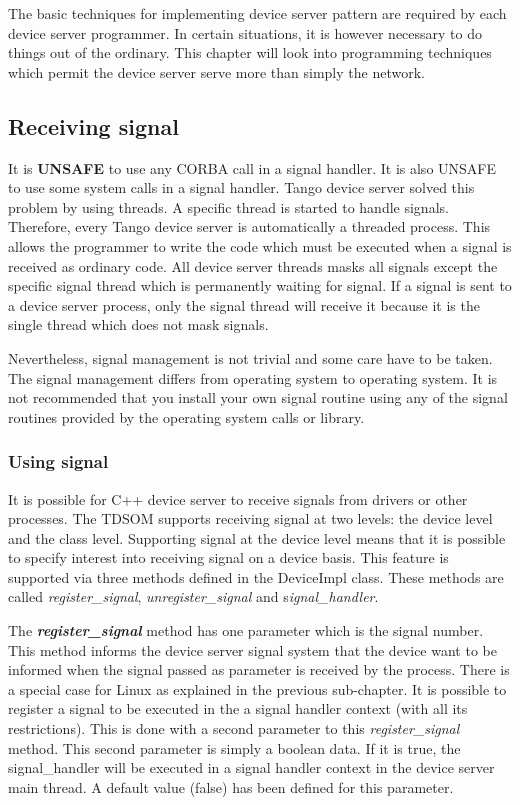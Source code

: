 The basic techniques for implementing device server pattern are required
by each device server programmer. In certain situations, it is however
necessary to do things out of the ordinary. This chapter will look
into programming techniques which permit the device server serve more
than simply the network.

\subsection{Receiving signal}

It is \textbf{UNSAFE} to use any CORBA call in a signal handler. It
is also UNSAFE to use some system calls in a signal handler. Tango
device server solved this problem by using threads.
A specific thread is started to handle signals. Therefore,
every Tango device server is automatically a threaded process. This
allows the programmer to write the code which must be executed when
a signal is received as ordinary code. All device server threads masks
all signals except the specific signal thread which is permanently
waiting for signal. If a signal is sent to a device server process,
only the signal thread will receive it because it is the single thread
which does not mask signals.

Nevertheless, signal management is not trivial and some care have
to be taken. The signal management differs from operating system to
operating system. It is not recommended that you install your own
signal routine using any of the signal routines provided by the operating
system calls or library. 

\subsubsection{Using signal}

It is possible for C++ device server to receive signals from drivers
or other processes. The TDSOM supports receiving signal at two levels:
the device level and the class level. Supporting signal at the device
level means that it is possible to specify interest into receiving
signal on a device basis. This feature is supported via three methods
defined in the DeviceImpl class. These methods
are called \emph{register\_signal}, \emph{unregister\_signal} and
s\emph{ignal\_handler}.

The \textbf{\emph{register\_signal}} method
has one parameter which is the signal number. This method informs
the device server signal system that the device want to be informed
when the signal passed as parameter is received by the process. There
is a special case for Linux as explained in the previous sub-chapter.
It is possible to register a signal to be executed in the a signal
handler context (with all its restrictions). This is done with a second
parameter to this \emph{register\_signal} method. This second parameter
is simply a boolean data. If it is true, the signal\_handler will
be executed in a signal handler context in the device server main
thread. A default value (false) has been defined for this parameter.

